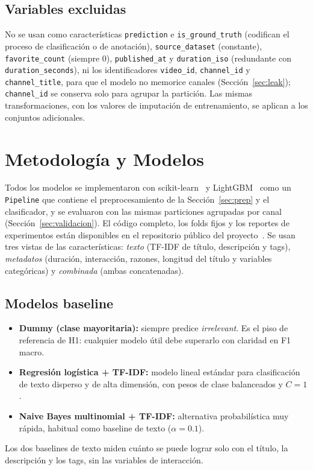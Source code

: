 \documentclass[conference]{IEEEtran}
\begin{document}
\subsection{Variables excluidas}
No se usan como características \texttt{prediction} e \texttt{is\_ground\_truth} (codifican el proceso de clasificación o de anotación), \texttt{source\_dataset} (constante), \texttt{favorite\_count} (siempre 0), \texttt{published\_at} y \texttt{duration\_iso} (redundante con \texttt{duration\_seconds}), ni los identificadores \texttt{video\_id}, \texttt{channel\_id} y \texttt{channel\_title}, para que el modelo no memorice canales (Sección~\ref{sec:leak}); \texttt{channel\_id} se conserva solo para agrupar la partición. Las mismas transformaciones, con los valores de imputación de entrenamiento, se aplican a los conjuntos adicionales.

\section{Metodología y Modelos}\label{sec:metodologia}
Todos los modelos se implementaron con scikit-learn~\cite{sklearn} y LightGBM~\cite{lightgbm} como un \texttt{Pipeline} que contiene el preprocesamiento de la Sección~\ref{sec:prep} y el clasificador, y se evaluaron con las mismas particiones agrupadas por canal (Sección~\ref{sec:validacion}). El código completo, los folds fijos y los reportes de experimentos están disponibles en el repositorio público del proyecto~\cite{urbina2026machinelearning}. Se usan tres vistas de las características: \textit{texto} (TF-IDF de título, descripción y tags), \textit{metadatos} (duración, interacción, razones, longitud del título y variables categóricas) y \textit{combinada} (ambas concatenadas).

\subsection{Modelos baseline}\label{sec:baseline}
\begin{itemize}
\item \textbf{Dummy (clase mayoritaria):} siempre predice \textit{irrelevant}. Es el piso de referencia de H1: cualquier modelo útil debe superarlo con claridad en F1 macro.
\item \textbf{Regresión logística + TF-IDF:} modelo lineal estándar para clasificación de texto disperso y de alta dimensión, con pesos de clase balanceados y $C=1$.
\item \textbf{Naive Bayes multinomial + TF-IDF:} alternativa probabilística muy rápida, habitual como baseline de texto ($\alpha=0.1$).
\end{itemize}
Los dos baselines de texto miden cuánto se puede lograr solo con el título, la descripción y los tags, sin las variables de interacción.
\end{document}

